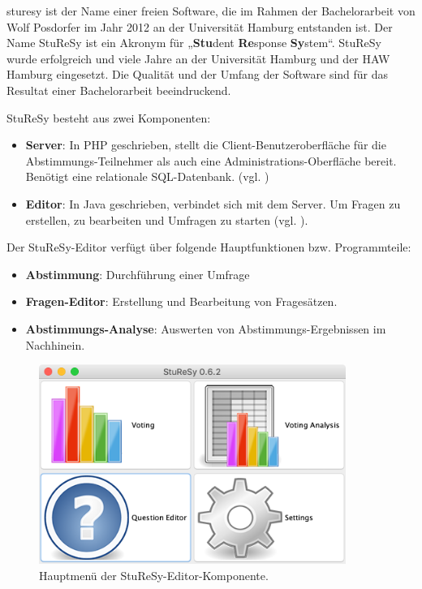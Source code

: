\ac{sturesy} ist der Name einer freien Software, die im Rahmen der Bachelorarbeit von Wolf Posdorfer im Jahr 2012 an der Universität Hamburg entstanden ist\cite{sturesy}. Der Name StuReSy ist ein Akronym für „\textbf{Stu}dent \textbf{Re}sponse \textbf{Sy}stem“. StuReSy wurde erfolgreich und viele Jahre an der Universität Hamburg und der HAW Hamburg eingesetzt. Die Qualität und der Umfang der Software sind für das Resultat einer Bachelorarbeit beeindruckend.

StuReSy besteht aus zwei Komponenten:
\begin{itemize}
    \item \textbf{Server}: In PHP geschrieben, stellt die Client-Benutzeroberfläche für die Abstimmungs-Teilnehmer als auch eine Administrations-Oberfläche bereit. Benötigt eine relationale SQL-Datenbank. (vgl. \cite{web:sturesy_server_github})
    \item \textbf{Editor}: In Java geschrieben, verbindet sich mit dem Server. Um Fragen zu erstellen, zu bearbeiten und Umfragen zu starten (vgl. \cite{web:sturesy_client_github}).
\end{itemize}


Der StuReSy-Editor verfügt über folgende Hauptfunktionen bzw. Programmteile:
\begin{itemize}
    \item \textbf{Abstimmung}: Durchführung einer Umfrage
    \item \textbf{Fragen-Editor}: Erstellung und Bearbeitung von Fragesätzen.
    \item \textbf{Abstimmungs-Analyse}: Auswerten von Abstimmungs-Ergebnissen im Nachhinein.
\end{itemize}

\begin{figure}[H]
    \includegraphics[width=10cm]{chapter/bewertung/bilder/StuReSy_Hauptmenue.png}
    \centering
    \caption{Hauptmenü der StuReSy-Editor-Komponente.}
    \label{abb:sturesy_hauptmenue}
\end{figure}


